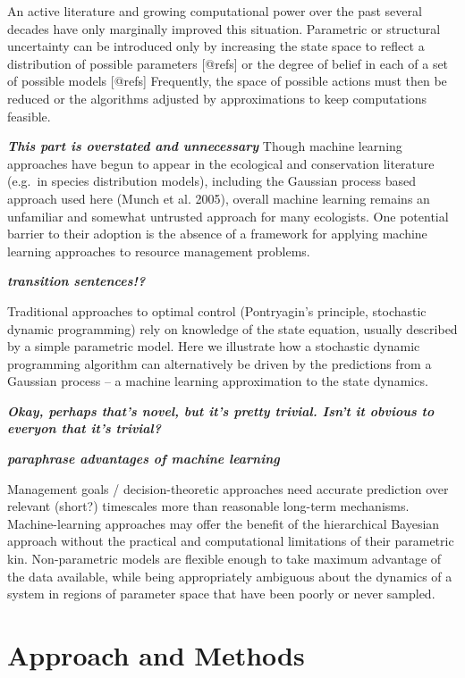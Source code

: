 \documentclass[author-year, review]{elsarticle} %
\begin{document}
An active literature and growing computational power over the past
several decades have only marginally improved this situation. Parametric
or structural uncertainty can be introduced only by increasing the state
space to reflect a distribution of possible parameters {[}@refs{]} or
the degree of belief in each of a set of possible models {[}@refs{]}
Frequently, the space of possible actions must then be reduced or the
algorithms adjusted by approximations to keep computations feasible.

 \textbf{\emph{This part is overstated and unnecessary}} Though machine
learning approaches have begun to appear in the ecological and
conservation literature (e.g.~in species distribution models), including
the Gaussian process based approach used here (Munch et al. 2005),
overall machine learning remains an unfamiliar and somewhat untrusted
approach for many ecologists. One potential barrier to their adoption is
the absence of a framework for applying machine learning approaches to
resource management problems.

\textbf{\emph{transition sentences!?}}

Traditional approaches to optimal control (Pontryagin's principle,
stochastic dynamic programming) rely on knowledge of the state equation,
usually described by a simple parametric model. Here we illustrate how a
stochastic dynamic programming algorithm can alternatively be driven by
the predictions from a Gaussian process -- a machine learning
approximation to the state dynamics.

\textbf{\emph{Okay, perhaps that's novel, but it's pretty trivial. Isn't
it obvious to everyon that it's trivial?}}

\textbf{\emph{paraphrase advantages of machine learning}}

Management goals / decision-theoretic approaches need accurate
prediction over relevant (short?) timescales more than reasonable
long-term mechanisms. Machine-learning approaches may offer the benefit
of the hierarchical Bayesian approach without the practical and
computational limitations of their parametric kin. Non-parametric models
are flexible enough to take maximum advantage of the data available,
while being appropriately ambiguous about the dynamics of a system in
regions of parameter space that have been poorly or never sampled.

\section{Approach and Methods}
\end{document}
